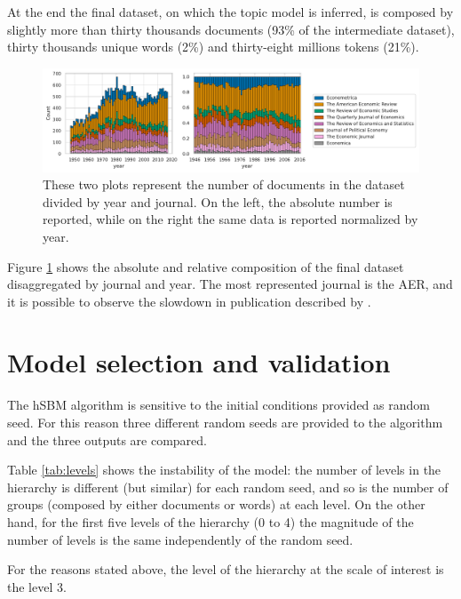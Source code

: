 \documentclass[a4paper, 11pt, headings=standardclasses, tablecaptionsbelow]{scrartcl}
\begin{document}
At the end the final dataset, on which the topic model is inferred, is composed by slightly more than thirty thousands documents (93\% of the intermediate dataset), thirty thousands unique words (2\%) and thirty-eight millions tokens (21\%).

\begin{figure}[tb]
  \centering
  \includegraphics[width=\textwidth]{src/journals.pdf}
  \caption[Number of documents per journal and year]{These two plots represent the number of documents in the dataset divided by year and journal. On the left, the absolute number is reported, while on the right the same data is reported normalized by year.}
  \label{fig:journals}
\end{figure}

Figure \ref{fig:journals} shows the absolute and relative composition of the final dataset disaggregated by journal and year.
The most represented journal is the AER, and it is possible to observe the slowdown in publication described by \textcite{ellison2003,card2013}.

\section{Model selection and validation}
The hSBM algorithm is sensitive to the initial conditions provided as random seed. For this reason three different random seeds are provided to the algorithm and the three outputs are compared.



Table \ref{tab:levels} shows the instability of the model: the number of levels in the hierarchy is different (but similar) for each random seed, and so is the number of groups (composed by either documents or words) at each level.
On the other hand, for the first five levels of the hierarchy (0 to 4) the magnitude of the number of levels is the same independently of the random seed.

For the reasons stated above, the level of the hierarchy at the scale of interest is the level 3.
\end{document}
